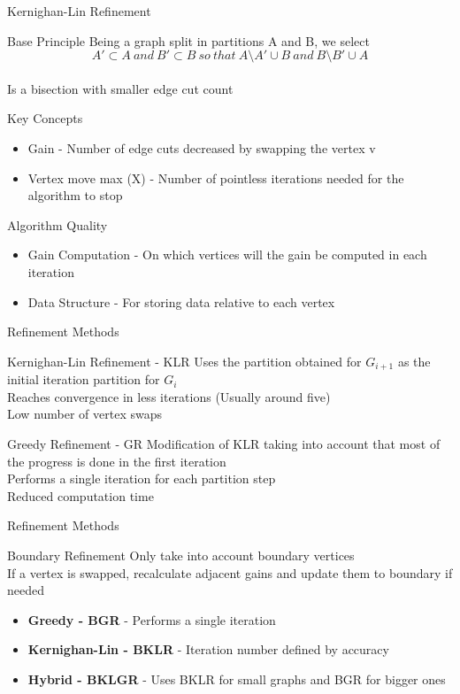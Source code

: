 \documentclass{beamer}
\begin{document}
\begin{frame}{Kernighan-Lin Refinement}
	\begin{block}{Base Principle}
		Being a graph split in partitions A and B, we select
		\[A'\subset A~and~B'\subset B~so~that~A\setminus A'\cup B~and~B\setminus B'\cup A\]\\
		Is a bisection with smaller edge cut count
	\end{block}
	\begin{block}{Key Concepts}
		\begin{itemize}
			\item Gain - Number of edge cuts decreased by swapping the vertex v
			\item Vertex move max (X) - Number of pointless iterations needed for the algorithm to stop
		\end{itemize}
	\end{block}
	\begin{block}{Algorithm Quality}
		\begin{itemize}
			\item Gain Computation - On which vertices will the gain be computed in each iteration
			\item Data Structure - For storing data relative to each vertex
		\end{itemize}
	\end{block}
\end{frame}
\begin{frame}{Refinement Methods}
	\begin{block}{Kernighan-Lin Refinement - KLR}
		Uses the partition obtained for \(G_{i+1}\) as the initial iteration partition for \(G_{i}\)\\
		Reaches convergence in less iterations (Usually around five)\\
		Low number of vertex swaps
	\end{block}
	\begin{block}{Greedy Refinement - GR}
		Modification of KLR taking into account that most of the progress is done in the first iteration\\
		Performs a single iteration for each partition step\\
		Reduced computation time
	\end{block}
\end{frame}
\begin{frame}{Refinement Methods}	
	\begin{block}{Boundary Refinement}
		Only take into account boundary vertices\\
		If a vertex is swapped, recalculate adjacent gains and update them to boundary if needed		
		\begin{itemize}
			\item \textbf{Greedy - BGR} - Performs a single iteration
			\item \textbf{Kernighan-Lin - BKLR} - Iteration number defined by accuracy
			\item \textbf{Hybrid - BKLGR} - Uses BKLR for small graphs and BGR for bigger ones
		\end{itemize}
	\end{block}
\end{frame}
\end{document}
